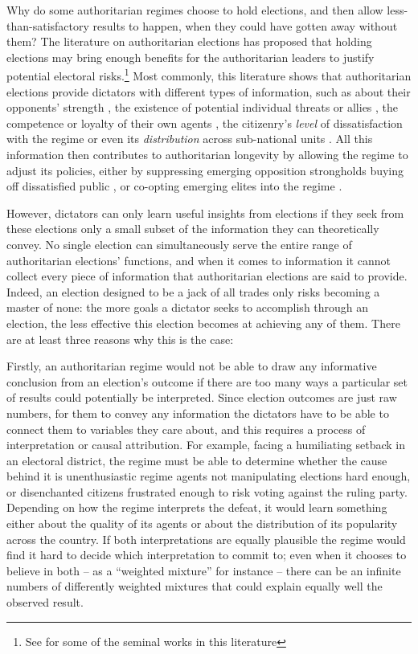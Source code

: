 \documentclass[12pt]{article}
\newcommand\fnote[1]{\footnote{\baselineskip=2\normalbaselineskip#1}}
\newcommand{\1}{\mathbbm{1}}
\begin{document}
Why do some authoritarian regimes choose to hold elections, and then allow less-than-satisfactory results to happen, when they could have gotten away without them? The literature on authoritarian elections has proposed that holding elections may bring enough benefits for the authoritarian leaders to justify potential electoral risks.\fnote{See \citet{ LustOkar2005, AR2005, Magaloni2006, Blaydes2010, Miller2015, Cox2009, Geddes2018} for some of the seminal works in this literature} Most commonly, this literature shows that authoritarian elections provide dictators with different types of information, such as about their opponents' strength \citep{Geddes2018}, the existence of potential individual threats or allies \citep{LustOkar2005}, the competence or loyalty of their own agents \citep{Magaloni2006, Blaydes2010, Myagkov2009, RundlettSvolik2016}, the citizenry's \textit{level} of dissatisfaction with the regime \citep{Miller2015} or even its \textit{distribution} across sub-national units \citep{Magaloni2006, Blaydes2010}. All this information then contributes to authoritarian longevity by allowing the regime to adjust its policies, either by suppressing emerging opposition strongholds \citep{Magaloni2006, Blaydes2010} buying off dissatisfied public \citep{Miller2015, Magaloni2006}, or co-opting emerging elites into the regime \citep{LustOkar2005}.

However, dictators can only learn useful insights from elections if they seek from these elections only a small subset of the information they can theoretically convey. No single election can simultaneously serve the entire range of authoritarian elections' functions, and when it comes to information it cannot collect every piece of information that authoritarian elections are said to provide. Indeed, an election designed to be a jack of all trades only risks becoming a master of none: the more goals a dictator seeks to accomplish through an election, the less effective this election becomes at achieving any of them. There are at least three reasons why this is the case:

Firstly, an authoritarian regime would not be able to draw any informative conclusion from an election's outcome if there are too many ways a particular set of results could potentially be interpreted. Since election outcomes are just raw numbers, for them to convey any information the dictators have to be able to connect them to variables they care about, and this requires a process of interpretation or causal attribution. For example, facing a humiliating setback in an electoral district, the regime must be able to determine whether the cause behind it is unenthusiastic regime agents not manipulating elections hard enough, or disenchanted citizens frustrated enough to risk voting against the ruling party. Depending on how the regime interprets the defeat, it would learn something either about the quality of its agents or about the distribution of its popularity across the country. If both interpretations are equally plausible the regime would find it hard to decide which interpretation to commit to; even when it chooses to believe in both -- as a ``weighted mixture'' for instance -- there can be an infinite numbers of differently weighted mixtures that could explain equally well the observed result. 
\end{document}
